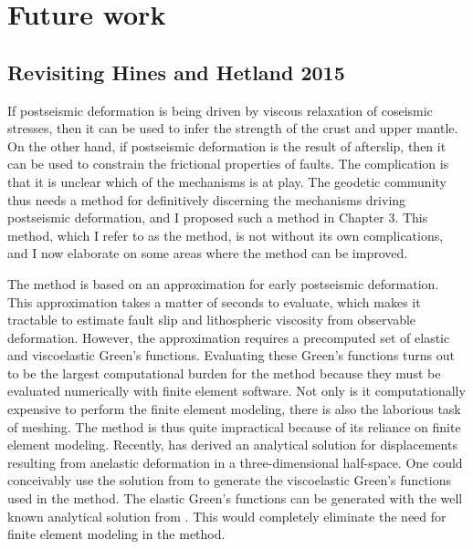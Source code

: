 \section{Future work}
\subsection{Revisiting Hines and Hetland 2015}
If postseismic deformation is being driven by viscous relaxation of
coseismic stresses, then it can be used to infer the strength of the
crust and upper mantle. On the other hand, if postseismic deformation
is the result of afterslip, then it can be used to constrain the
frictional properties of faults. The complication is that it is
unclear which of the mechanisms is at play. The geodetic community
thus needs a method for definitively discerning the mechanisms driving
postseismic deformation, and I proposed such a method in Chapter 3.
This method, which I refer to as the \citet{Hines2016} method, is not
without its own complications, and I now elaborate on some areas where
the method can be improved.

The \citet{Hines2016} method is based on an approximation for early
postseismic deformation. This approximation takes a matter of seconds
to evaluate, which makes it tractable to estimate fault slip and
lithospheric viscosity from observable deformation. However, the
approximation requires a precomputed set of elastic and viscoelastic
Green's functions. Evaluating these Green's functions turns out to be
the largest computational burden for the \citet{Hines2016} method
because they must be evaluated numerically with finite element
software. Not only is it computationally expensive to perform the
finite element modeling, there is also the laborious task of meshing.
The \citet{Hines2016} method is thus quite impractical because of its
reliance on finite element modeling. Recently, \citet{Barbot2017} has
derived an analytical solution for displacements resulting from
anelastic deformation in a three-dimensional half-space. One could
conceivably use the solution from \citet{Barbot2017} to generate the
viscoelastic Green's functions used in the \citet{Hines2016} method.
The elastic Green's functions can be generated with the well known
analytical solution from \citet{Okada1992}. This would completely
eliminate the need for finite element modeling in the
\citet{Hines2016} method.
 
